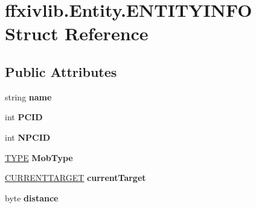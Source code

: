 \hypertarget{structffxivlib_1_1_entity_1_1_e_n_t_i_t_y_i_n_f_o}{\section{ffxivlib.\-Entity.\-E\-N\-T\-I\-T\-Y\-I\-N\-F\-O Struct Reference}
\label{structffxivlib_1_1_entity_1_1_e_n_t_i_t_y_i_n_f_o}
}
\subsection*{Public Attributes}
\begin{DoxyCompactItemize}
\item 
\hypertarget{structffxivlib_1_1_entity_1_1_e_n_t_i_t_y_i_n_f_o_afa81612dd1f40544b2bc987c0d224413}{string {\bfseries name}}\label{structffxivlib_1_1_entity_1_1_e_n_t_i_t_y_i_n_f_o_afa81612dd1f40544b2bc987c0d224413}

\item 
\hypertarget{structffxivlib_1_1_entity_1_1_e_n_t_i_t_y_i_n_f_o_af4340fb1575aed1491d220b0996277e3}{int {\bfseries P\-C\-I\-D}}\label{structffxivlib_1_1_entity_1_1_e_n_t_i_t_y_i_n_f_o_af4340fb1575aed1491d220b0996277e3}

\item 
\hypertarget{structffxivlib_1_1_entity_1_1_e_n_t_i_t_y_i_n_f_o_a201031ed99104aa84eddcacdfa0276c7}{int {\bfseries N\-P\-C\-I\-D}}\label{structffxivlib_1_1_entity_1_1_e_n_t_i_t_y_i_n_f_o_a201031ed99104aa84eddcacdfa0276c7}

\item 
\hypertarget{structffxivlib_1_1_entity_1_1_e_n_t_i_t_y_i_n_f_o_a42fd66513e50082589fa96b06b8bb5ca}{\hyperlink{namespaceffxivlib_aaa4e86d1ea6dbc1661147e6616256e68}{T\-Y\-P\-E} {\bfseries Mob\-Type}}\label{structffxivlib_1_1_entity_1_1_e_n_t_i_t_y_i_n_f_o_a42fd66513e50082589fa96b06b8bb5ca}

\item 
\hypertarget{structffxivlib_1_1_entity_1_1_e_n_t_i_t_y_i_n_f_o_ace1351810603910b7d8793c513e805ba}{\hyperlink{namespaceffxivlib_a027fd426531e3a42243f5c2b946dde31}{C\-U\-R\-R\-E\-N\-T\-T\-A\-R\-G\-E\-T} {\bfseries current\-Target}}\label{structffxivlib_1_1_entity_1_1_e_n_t_i_t_y_i_n_f_o_ace1351810603910b7d8793c513e805ba}

\item 
\hypertarget{structffxivlib_1_1_entity_1_1_e_n_t_i_t_y_i_n_f_o_a0e6a62641ac2a74cad2676eec880ac55}{byte {\bfseries distance}}\label{structffxivlib_1_1_entity_1_1_e_n_t_i_t_y_i_n_f_o_a0e6a62641ac2a74cad2676eec880ac55}


\end{DoxyCompactItemize}
